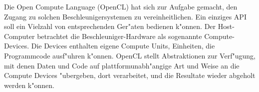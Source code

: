 Die Open Compute Language (OpenCL) hat sich zur Aufgabe gemacht, den
Zugang zu solchen Beschleunigersystemen zu vereinheitlichen.
Ein einziges API soll ein Vielzahl von entsprechenden Ger"aten bedienen
k"onnen.
Der Host-Computer betrachtet die Beschleuniger-Hardware als sogenannte
Compute-Devices.
Die Devices enthalten eigene Compute Units, Einheiten,
die Programmcode ausf"uhren k"onnen.
OpenCL stellt Abstraktionen zur Verf"ugung, mit denen Daten und Code 
auf plattformunabh"angige Art und Weise an die Compute Devices "ubergeben,
dort verarbeitet, und die Resultate wieder abgeholt werden k"onnen.

